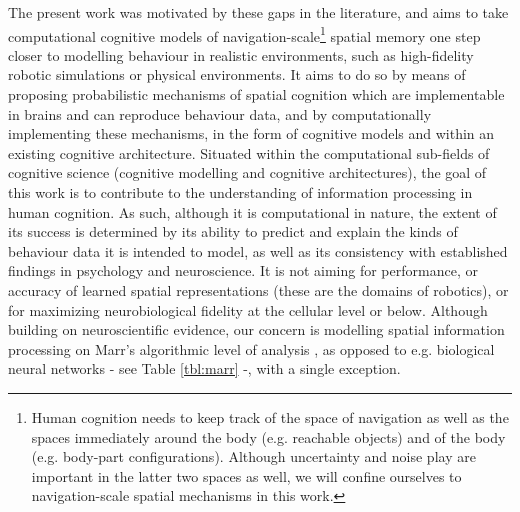 The present work was motivated by these gaps in the literature, and aims to take computational cognitive models of navigation-scale\footnote{Human cognition needs to keep track of the space of navigation as well as the spaces immediately around the body (e.g. reachable objects) and of the body (e.g. body-part configurations). Although uncertainty and noise play are important in the latter two spaces as well, we will confine ourselves to navigation-scale spatial mechanisms in this work.} spatial memory one step closer to modelling behaviour in realistic environments, such as high-fidelity robotic simulations or physical environments. It aims to do so by means of proposing probabilistic mechanisms of spatial cognition which are implementable in brains and can reproduce behaviour data, and by computationally implementing these mechanisms, in the form of cognitive models and within an existing cognitive architecture. Situated within the computational sub-fields of cognitive science (cognitive modelling and cognitive architectures), the goal of this work is to contribute to the understanding of information processing in human cognition. As such, although it is computational in nature, the extent of its success is determined by its ability to predict and explain the kinds of behaviour data it is intended to model, as well as its consistency with established findings in psychology and neuroscience. It is not aiming for performance, or accuracy of learned spatial representations (these are the domains of robotics), or for maximizing neurobiological fidelity at the cellular level or below. Although building on neuroscientific evidence, our concern is modelling spatial information processing on Marr's algorithmic level of analysis \citep{marr1976understanding, marr1977understanding}, as opposed to e.g. biological neural networks - see Table \ref{tbl:marr} -, with a single exception. 

